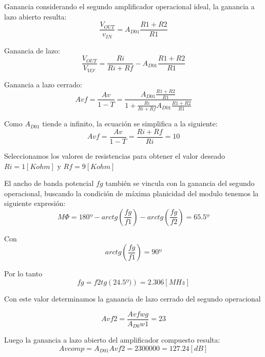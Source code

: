 \documentclass[12pt]{article}
\begin{document}
	Ganancia considerando el segundo amplificador operacional ideal, la ganancia a lazo abierto resulta:
	\begin{equation}
		\frac{V_{OUT}}{v_{IN}}=A_{D01}\frac{R1+R2}{R1}
	\end{equation}
	
	Ganancia de lazo:
	\begin{equation}
		\frac{V_{OUT}}{V_{VO'}}=\frac{Ri}{Ri+Rf}-A_{D01}\frac{R1+R2}{R1}
	\end{equation}
	
	Ganancia a lazo cerrado:
	\begin{equation}
		Avf=\frac{Av}{1-T}=\frac{A_{D01}\frac{R1+R2}{R1}}{1+\frac{Ri}{Ri+Rf}A_{D01}\frac{R1+R2}{R1}}
	\end{equation}
	
	Como $A_{D01}$ tiende a infinito, la ecuación se simplifica a la siguiente:
	\begin{equation}
			Avf=\frac{Av}{1-T}=\frac{Ri+Rf}{Ri}=10
	\end{equation}
	
	Seleccionamos los valores de resistencias para obtener el valor deseado $Ri=1[Kohm]$ y $Rf=9[Kohm]$
	
	El ancho de banda potencial $fg$ también se vincula con la ganancia del segundo operacional, buscando la condición de máxima planicidad del modulo tenemos la siguiente expresión:
	\begin{equation}
		M\Phi =180º -arctg\left( \frac{fg}{f1}\right) -arctg\left( \frac{fg}{f2}\right) =65.5º
	\end{equation}
	
	Con
	\begin{equation}
		arctg\left( \frac{fg}{f1}\right) =90º
	\end{equation}
	
	Por lo tanto 
	\begin{equation}
		fg=f2 tg\left( 24.5º)\right)=2.306[MHz]
	\end{equation}
	
	Con este valor determinamos la ganancia de lazo cerrado del segundo operacional
	
	\begin{equation}
		Avf2= \frac{Avf wg}{A_{D0} w1}=23
	\end{equation}
	
	Luego la ganancia a lazo abierto del amplificador compuesto resulta:
	\begin{equation}
		Avcomp=A_{D01}Avf2=2300000=127.24[dB]
	\end{equation}
	
\end{document}
